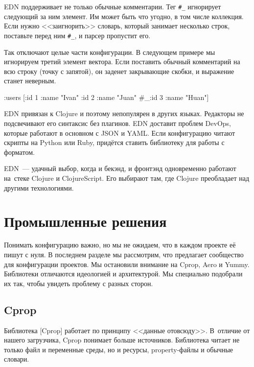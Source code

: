 
EDN поддерживает не только обычные комментарии. Тег \verb|#_| игнорирует
следующий за ним элемент. Им может быть что угодно, в том числе коллекция. Если
нужно <<заигнорить>> словарь, который занимает несколько строк, поставьте перед
ним \verb|#_|, и парсер пропустит его.


Так отключают целые части конфигурации. В следующем примере мы игнорируем третий
элемент вектора. Если поставить обычный комментарий на всю строку (точку с
запятой), он заденет закрывающие скобки, и выражение станет неверным.

\begin{english}
  \begin{clojure}
{:users [{:id 1 :name "Ivan"}
         {:id 2 :name "Juan"}
         #_{:id 3 :name "Huan"}]}
  \end{clojure}
\end{english}

EDN привязан к Clojure и поэтому непопулярен в других языках. Редакторы не
подсвечивают его синтаксис без плагинов. EDN доставит проблем DevOps, которые
работают в основном с JSON и YAML. Если конфигурацию читают скрипты на Python
или Ruby, придётся ставить библиотеку для работы с форматом.

EDN~--- удачный выбор, когда и бекэнд, и фронтэнд одновременно работают на~стеке
Clojure и ClojureScript. Его выбирают там, где Clojure преобладает над другими
технологиями.

\section{Промышленные решения}

Понимать конфигурацию важно, но мы не ожидаем, что в каждом проекте её пишут с
нуля. В последнем разделе мы рассмотрим, что предлагает сообщество для
конфигурации проектов. Мы остановили внимание на Cprop, Aero и Yummy. Библиотеки
отличаются идеологией и архитектурой. Мы специально подобрали их так, чтобы
увидеть проблему с разных сторон.

\subsection{Cprop}


Библиотека [Cprop] работает по
принципу <<данные отовсюду>>. В~отличие от нашего загрузчика, Cprop понимает
больше источников. Библиотека читает не только файл и переменные среды, но и
ресурсы, property-файлы и обычные словари.

